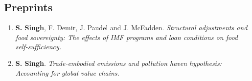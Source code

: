 
\subsection{Preprints}

\begin{enumerate}
	\item \textbf{S. Singh}, F. Demir, J. Paudel and J. McFadden. \textit{Structural adjustments and food sovereignty: The effects of IMF
programs and loan conditions on food self-sufficiency.}
	\item \textbf{S. Singh}. \textit{Trade-embodied emissions and pollution haven hypothesis: Accounting for global value chains.}
	\setcounter{publicationCounter}{\value{enumi}}	%
\end{enumerate}



